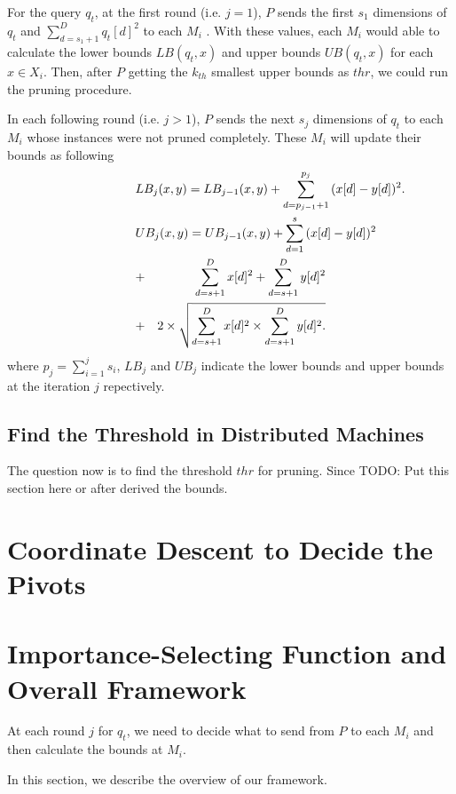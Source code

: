 For the query $q_t$, at the first round (i.e. $j=1$), $P$ sends the first $s_1$ dimensions of $q_t$ and $\sum^D_{d=s_1+1}{q_t[d]}^2$ to each $M_i$ .  With these values, each $M_i$ would able to calculate the lower bounds $LB(q_t,x)$ and upper bounds $UB(q_t,x)$ for each $x\in X_i$.  Then, after $P$ getting the $k_{th}$ smallest upper bounds as $thr$, we could run the pruning procedure.

In each following round (i.e. $j>1$), $P$ sends the next $s_j$ dimensions of $q_t$ to each $M_i$ whose instances were not pruned completely.  These $M_i$ will update their bounds as following
{
\begin{eqnarray}
\lefteqn{LB_j(x,y) = LB_{j-1}(x,y)+\sum^{p_j}_{d=p_{j-1}+1}{(x[d]-y[d])^2}.} \label{eq:single-LB} \\
\lefteqn{UB_j(x,y) = UB_{j-1}(x,y)+\sum^s_{d=1}{(x[d]-y[d])^2}} \notag \\
& + & \sum^D_{d=s+1}{x[d]^2}+\sum^D_{d=s+1}{y[d]^2} \notag \\
& + & 2 \times \sqrt{\sum^D_{d=s+1}{x[d]^2}\times \sum^D_{d=s+1}{y[d]^2}.}\label{eq:single-UB}
\end{eqnarray}
}
where $p_j=\sum^j_{i=1}{s_i}$, $LB_j$ and $UB_j$ indicate the lower bounds and upper bounds at the iteration $j$ repectively.



\subsection{Find the Threshold in Distributed Machines} %
\label{ss:find_the_threshold_in_distributed_machines}
The question now is to find the threshold $thr$ for pruning.  Since 
TODO: Put this section here or after derived the bounds.

\section{Coordinate Descent to Decide the Pivots} %
\label{sub:coordinate_descent_to_decide_the_pivots}



\section{Importance-Selecting Function and Overall Framework} %
\label{s:importance_selecting_function_and_overall_framework}
At each round $j$ for $q_t$, we need to decide what to send from $P$ to each $M_i$ and then calculate the bounds at $M_i$. 

In this section, we describe the overview of our framework.




%
%